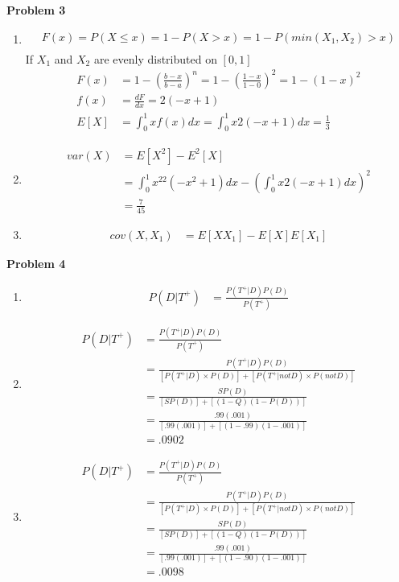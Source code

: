 \documentclass[11pt,letterpaper]{article}
\begin{document}
\textbf{Problem 3}
\begin{enumerate}[labelindent=0pt]
\item 
	\begin{align*}
	F(x)=P(X\leq x)= 1 - P(X> x) = 1 - P(min(X_{1},X_{2})>x) \\
	\end{align*}
If $X_{1}$ and $X_{2}$ are evenly distributed on $[0,1]$ \\
	\begin{align*}
	F(x) &= 1-\left(\frac{b-x}{b-a} \right)^n = 1-\left (\frac{1-x}{1-0}  \right )^2 = 1-\left ( 1-x \right )^2 \\
	f(x) &= \frac{dF}{dx} = 2\left(-x+1\right) \\
	E[X] &= \int_{0}^{1}xf(x)dx = \int_{0}^{1}x2(-x+1)dx = \frac{1}{3}
	\end{align*}
\item
	\begin{align*}
	var(X) & = E[X^2]-E^2[X] \\
	& = \int_{0}^{1}x^22(-x^2+1)dx -\left ( \int_{0}^{1}x2(-x+1)dx
\right)^2\\
& = \frac{7}{45}
	\end{align*}
\item
	\begin{align*}
	cov(X,X_{1}) & = E[XX_{1}]-E[X]E[X_{1}]
	\end{align*}
\end{enumerate}

\textbf{Problem 4}
\begin{enumerate}[labelindent=0pt]
\item 
	\begin{align*}
	P(D|T^+) & =\tfrac{P(T^+|D)P(D)}{P(T^+)}
	\end{align*}
\item 
	\begin{align*}
	P(D|T^+) & =\tfrac{P(T^+|D)P(D)}{P(T^+)} \\
	& =\tfrac{P(T^+|D)P(D)}{[P(T^+|D)\times P(D)]+[P(T^+|not D)\times
P(not D)]} \\
	& = \tfrac{SP(D)}{[SP(D)]+[(1-Q)(1-P(D))]} \\
	& = \tfrac{.99(.001)}{[.99(.001)]+[(1-.99)(1-.001)]} \\
	& = .0902
	\end{align*}
\item 
	\begin{align*}
	P(D|T^+) & =\tfrac{P(T^+|D)P(D)}{P(T^+)} \\
	& =\tfrac{P(T^+|D)P(D)}{[P(T^+|D)\times P(D)]+[P(T^+|not D)\times
P(not D)]} \\
	& = \tfrac{SP(D)}{[SP(D)]+[(1-Q)(1-P(D))]} \\
	& = \tfrac{.99(.001)}{[.99(.001)]+[(1-.90)(1-.001)]} \\
	& = .0098
	\end{align*}
\end{enumerate}
\end{document}
